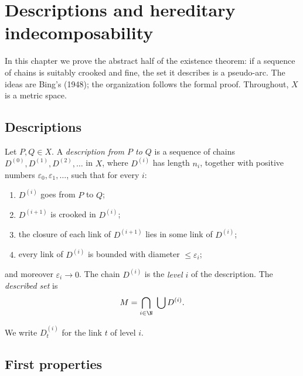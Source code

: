 \chapter{Descriptions and hereditary indecomposability}\label{ch:descriptions}

In this chapter we prove the abstract half of the existence theorem: if a sequence of chains
is suitably crooked and fine, the set it describes is a pseudo-arc. The ideas are Bing's
(1948); the organization follows the formal proof. Throughout, $X$ is a metric space.

\section{Descriptions}

\begin{definition}[Description]\label{def:description}
Let $P,Q\in X$. A \emph{description from $P$ to $Q$} is a sequence of chains
$D^{(0)},D^{(1)},D^{(2)},\dots$ in $X$, where $D^{(i)}$ has length $n_i$, together with positive
numbers $\varepsilon_0,\varepsilon_1,\dots$, such that for every $i$:
\begin{enumerate}[label=(D\arabic*)]
\item\label{D:from} $D^{(i)}$ goes from $P$ to $Q$;
\item\label{D:crooked} $D^{(i+1)}$ is crooked in $D^{(i)}$;
\item\label{D:closure} the closure of each link of $D^{(i+1)}$ lies in some link of $D^{(i)}$;
\item\label{D:mesh} every link of $D^{(i)}$ is bounded with diameter $\le\varepsilon_i$;
\end{enumerate}
and moreover $\varepsilon_i\to0$. The chain $D^{(i)}$ is the \emph{level $i$} of the
description. The \emph{described set} is
\[
M=\bigcap_{i\in\N}\ \bigcup D^{(i)} .
\]
\end{definition}

We write $D^{(i)}_t$ for the link $t$ of level $i$.


\section{First properties}

